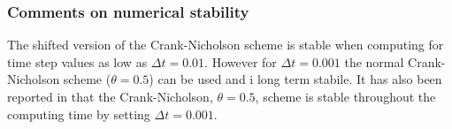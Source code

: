 \subsubsection*{Comments on numerical stability}
The shifted version of the Crank-Nicholson scheme is stable when computing for time step values as low as $\Delta t = 0.01$. However for $\Delta t = 0.001$ the normal Crank-Nicholson scheme ($\theta =0.5$) can be used and i long term stabile. It has also been reported in \cite{Wick2011} that the Crank-Nicholson, $\theta = 0.5$, scheme is stable throughout the computing time by setting $\Delta t = 0.001$.



